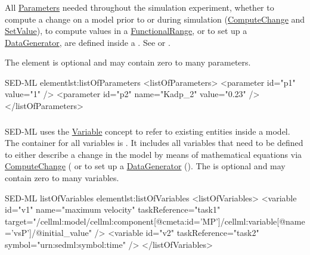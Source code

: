 \subsubsection{}
\label{sec:listOfParameters}
All \hyperref[class:parameter]{Parameters} needed throughout the simulation experiment, whether to compute a change on a model prior to or during simulation (\hyperref[class:computeChange]{ComputeChange} and \hyperref[class:setValue]{SetValue}), to compute values in a \hyperref[class:functionalRange]{FunctionalRange}, or to set up a \hyperref[class:dataGenerator]{DataGenerator}, are defined inside a . See  or .

The element is optional and may contain zero to many parameters.

\begin{myXmlLst}{SED-ML  element}{lst:listOfParameters}
<listOfParameters>
	<parameter id="p1" value="1" />
	<parameter id="p2" name="Kadp_2" value="0.23" />
</listOfParameters>
\end{myXmlLst}


\subsubsection{}
\label{sec:listOfVariables}
SED-ML uses the \hyperref[class:variable]{Variable} concept to refer to existing entities inside a model. The container for all variables is  . It includes all variables that need to be defined to either describe a change in the model by means of mathematical equations via \hyperref[class:computeChange]{ComputeChange} ( or to set up a \hyperref[class:dataGenerator]{DataGenerator} (). The  is optional and may contain zero to many variables. 

\begin{myXmlLst}{SED-ML listOfVariables element}{lst:listOfVariables}
<listOfVariables>
	<variable id="v1" name="maximum velocity" taskReference="task1" 
		target="/cellml:model/cellml:component[@cmeta:id='MP']/cellml:variable[@name='vsP']/@initial_value" />
	<variable id="v2" taskReference="task2" symbol="urn:sedml:symbol:time" />
</listOfVariables>
\end{myXmlLst}

